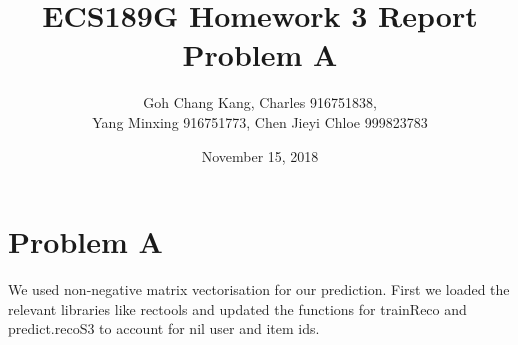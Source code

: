 \documentclass{article}
\begin{document}
\begin{titlepage}
\title{ECS189G Homework 3 Report Problem A}
\author{Goh Chang Kang, Charles 916751838, \\
Yang Minxing 916751773, Chen Jieyi Chloe 999823783}

\date{November 15, 2018}
\maketitle
\end{titlepage}


\section{Problem A}
We used non-negative matrix vectorisation for our prediction. First we loaded the relevant libraries like rectools and updated the functions for trainReco and predict.recoS3 to account for nil user and item ids. 
\end{document}
